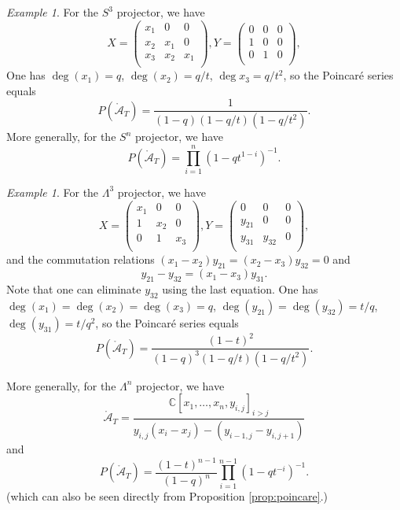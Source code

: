 \documentclass[12pt]{amsart}
\numberwithin{equation}{section}
\theoremstyle{definition}
\theoremstyle{remark}
\newtheorem{example}[theorem]{Example}
\newcommand{\CC}{\mathbb{C}}
\newcommand{\CA}{\mathcal{A}}
\renewcommand{\1}{\mathbf{1}}
\newcommand{\oCA}{\mathring{\CA}}
\begin{document}
\begin{example}
\label{ex:Sym n}
For the $S^3$ projector, we have
$$
X=\left(\begin{matrix}
x_1 & 0 & 0\\
x_2 & x_1 & 0\\
x_3 & x_2 & x_1\\
\end{matrix}\right),
Y=\left(\begin{matrix}
0 & 0 & 0\\
1 & 0 & 0\\
0 & 1 & 0\\
\end{matrix}\right),
$$
One has $\deg(x_1)=q$, $\deg(x_2)=q/t$, $\deg x_3=q/t^2$, so the Poincar\'e series equals 
$$
P(\oCA_T)=\frac{1}{(1-q)(1-q/t)(1-q/t^2)}.
$$
More generally, for the \(S^n\) projector, we have 
$$
P(\oCA_T)=\prod_{i=1}^n{(1-qt^{1-i})^{-1}}.
$$

\end{example}


\begin{example}
\label{ex:Lambda n}
For the $\Lambda^3$ projector, we have
$$
X=\left(\begin{matrix}
x_1 & 0 & 0\\
1   & x_2 & 0\\
0 & 1 & x_3\\
\end{matrix}\right),
Y=\left(\begin{matrix}
0 & 0 & 0\\
y_{21} & 0 & 0\\
y_{31} & y_{32} & 0\\
\end{matrix}\right),
$$
and the commutation relations $(x_1-x_2)y_{21}=(x_2-x_3)y_{32}=0$ and
$$
y_{21}-y_{32}=(x_{1}-x_{3})y_{31}.
$$
Note that one can eliminate $y_{32}$ using the last equation.
One has $\deg(x_1)=\deg(x_2)=\deg(x_3)=q$, $\deg(y_{21})=\deg(y_{32})=t/q$, $\deg(y_{31})=t/q^2$,  so the Poincar\'e series equals 
$$
P(\oCA_T)=\frac{(1-t)^2}{(1-q)^3(1-q/t)(1-q/t^2)}.
$$

More generally, for the \(\Lambda^n\) projector, we have 
 $$\oCA_T= \frac {\CC[x_1,\ldots,x_n, y_{i,j}]_{i>j}}{y_{i,j}(x_i-x_j) - (y_{i-1,j} - y_{i,j+1})} $$
 and 
 $$
P(\oCA_T)=\frac{(1-t)^{n-1}}{(1-q)^n}\prod_{i=1}^{n-1}(1-qt^{-i})^{-1}.
$$
(which can also be seen directly from Proposition \ref{prop:poincare}.)
\end{example}
\end{document}
